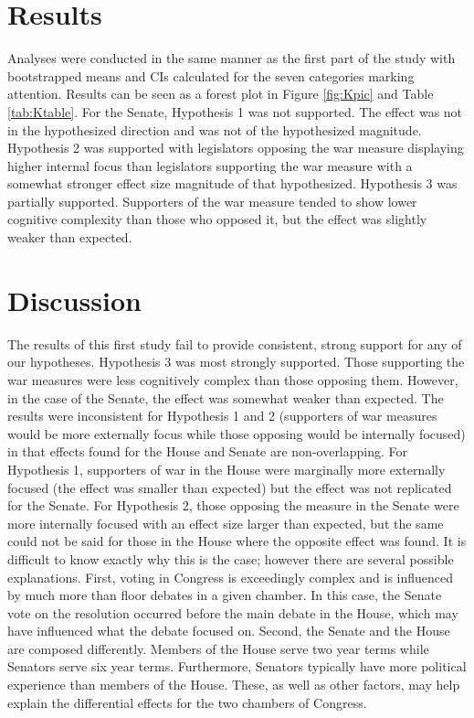 \documentclass[english,,man]{apa6}
\begin{document}
\hypertarget{results-1}{%
\section{Results}\label{results-1}}

Analyses were conducted in the same manner as the first part of the study with bootstrapped means and CIs calculated for the seven categories marking attention. Results can be seen as a forest plot in Figure \ref{fig:Kpic} and Table \ref{tab:Ktable}. For the Senate, Hypothesis 1 was not supported. The effect was not in the hypothesized direction and was not of the hypothesized magnitude. Hypothesis 2 was supported with legislators opposing the war measure displaying higher internal focus than legislators supporting the war measure with a somewhat stronger effect size magnitude of that hypothesized. Hypothesis 3 was partially supported. Supporters of the war measure tended to show lower cognitive complexity than those who opposed it, but the effect was slightly weaker than expected.

\hypertarget{discussion}{%
\section{Discussion}\label{discussion}}

The results of this first study fail to provide consistent, strong support for any of our hypotheses. Hypothesis 3 was most strongly supported. Those supporting the war measures were less cognitively complex than those opposing them. However, in the case of the Senate, the effect was somewhat weaker than expected. The results were inconsistent for Hypothesis 1 and 2 (supporters of war measures would be more externally focus while those opposing would be internally focused) in that effects found for the House and Senate are non-overlapping. For Hypothesis 1, supporters of war in the House were marginally more externally focused (the effect was smaller than expected) but the effect was not replicated for the Senate. For Hypothesis 2, those opposing the measure in the Senate were more internally focused with an effect size larger than expected, but the same could not be said for those in the House where the opposite effect was found.
It is difficult to know exactly why this is the case; however there are several possible explanations. First, voting in Congress is exceedingly complex and is influenced by much more than floor debates in a given chamber. In this case, the Senate vote on the resolution occurred before the main debate in the House, which may have influenced what the debate focused on. Second, the Senate and the House are composed differently. Members of the House serve two year terms while Senators serve six year terms. Furthermore, Senators typically have more political experience than members of the House. These, as well as other factors, may help explain the differential effects for the two chambers of Congress.
\end{document}
